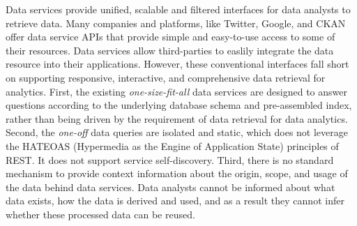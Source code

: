 \documentclass[10pt, conference, compsocconf]{IEEEtran}
\begin{document}




Data services provide unified, scalable and filtered interfaces for data analysts to retrieve data\cite{borkar2006xml}. Many companies and platforms, like Twitter, Google, and CKAN\cite{CKAN} offer data service APIs that provide simple and easy-to-use access to some of their resources. Data services allow third-parties to easlily integrate the data resource into their applications. However, these conventional interfaces fall short on supporting responsive, interactive, and comprehensive data retrieval for analytics. First, the existing \textit{one-size-fit-all} data services are designed to answer questions according to the underlying database schema and pre-assembled index, rather than being driven by the requirement of data retrieval for data analytics\cite{dillon2013towards}. Second, the \textit{one-off} data queries are isolated and static, which does not leverage the HATEOAS (Hypermedia as the Engine of Application State) principles of REST. It does not support service self-discovery. Third, there is no standard mechanism to provide context information about the origin, scope, and usage of the data behind data services. Data analysts cannot be informed about what data exists, how the data is derived and used, and as a result they cannot infer whether these processed data can be reused. 
\end{document}
